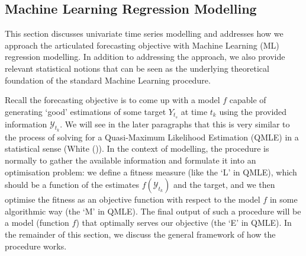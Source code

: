 \subsection{Machine Learning Regression Modelling}\label{subsec: ML modelling}
This section discusses univariate time series modelling and addresses how we approach the articulated forecasting objective with Machine Learning (ML) regression modelling. In addition to addressing the approach, we also provide relevant statistical notions that can be seen as the underlying theoretical foundation of the standard Machine Learning procedure.

Recall the forecasting objective is to come up with a model $f$ capable of generating `good' estimations of some target $Y_{t_s}$ at time $t_k$ using the provided information $\mathcal{Y}_{t_k}$. We will see in the later paragraphs that this is very similar to the process of solving for a Quasi-Maximum Likelihood Estimation (QMLE) in a statistical sense (White (\citeyear{white1982maximum})). In the context of modelling, the procedure is normally to gather the available information and formulate it into an optimisation problem: we define a fitness measure (like the `L' in QMLE), which should be a function of the estimates $f(\mathcal{Y}_{t_k})$ and the target, and we then optimise the fitness as an objective function with respect to the model $f$ in some algorithmic way (the `M' in QMLE). The final output of such a procedure will be a model (function $f$) that optimally serves our objective (the `E' in QMLE). In the remainder of this section, we discuss the general framework of how the procedure works.

